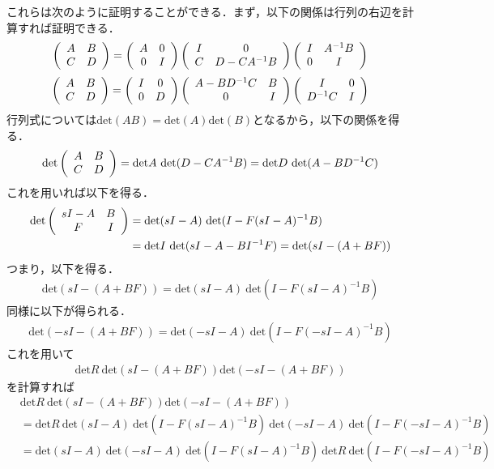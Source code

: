 これらは次のように証明することができる．まず，以下の関係は行列の右辺を計算すれば証明できる．
\begin{align}
	\bmatrix{cc}
		A & B \\
		C & D
	\ematrix
	=
	\bmatrix{cc}
		A & 0 \\
		0 & I
	\ematrix
	\bmatrix{cc}
		I & 0 \\
		C & D-C A^{-1}B
	\ematrix
	\bmatrix{cc}
		I & A^{-1}B \\
		0 & I
	\ematrix
\nonumber
\end{align}
\begin{align}
	\bmatrix{cc}
		A & B \\
		C & D
	\ematrix
	=
	\bmatrix{cc}
		I & 0 \\
		0 & D
	\ematrix
	\bmatrix{cc}
		A - B D^{-1} C & B \\
		0              & I
	\ematrix
	\bmatrix{cc}
		I        & 0 \\
		D^{-1} C & I
	\ematrix
\nonumber
\end{align}
行列式については$\mbox{det}(AB) = \mbox{det}(A)\mbox{det}(B)$となるから，以下の関係を得る．
\begin{align}
	\mbox{det}
	\bmatrix{cc}
		A & B \\
		C & D
	\ematrix
	=
	\mbox{det}A \ \mbox{det}(D-CA^{-1}B)
	=
	\mbox{det}D \ \mbox{det}({A-BD^{-1}C})	
\nonumber
\end{align}
これを用いれば以下を得る．
\begin{align}
	\mbox{det}
	\bmatrix{cc}
		sI-A & B \\
		F    & I
	\ematrix
	&=
	\mbox{det}(sI-A) \ \mbox{det}(I- F(sI-A)^{-1}B)
\nonumber \\
	&=
	\mbox{det}I \ \mbox{det}({sI-A - B I^{-1}F})	
	=
	\mbox{det}({sI-(A + B F)})	
\nonumber
\end{align}
つまり，以下を得る．
\begin{align}
	\mbox{det}({sI-(A + B F)})	
	=
	\mbox{det}(sI-A) \ \mbox{det}(I- F(sI-A)^{-1}B)
\end{align}
同様に以下が得られる．
\begin{align}
	\mbox{det}({-sI-(A + B F)})	
	=
	\mbox{det}(-sI-A) \ \mbox{det}(I- F(-sI-A)^{-1}B)
\end{align}
これを用いて
\begin{align}
	\mbox{det}R \ \mbox{det}({sI-(A + B F)})\mbox{det}({-sI-(A + B F)})
\nonumber
\end{align}
を計算すれば
\begin{align}
	& %
	\mbox{det}R \ \mbox{det}({sI-(A + B F)})\mbox{det}({-sI-(A + B F)})
\nonumber \\
		&= \mbox{det}R \ \mbox{det}(sI-A) \ \mbox{det}(I- F(sI-A)^{-1}B)
			\ \mbox{det}(-sI-A) \ \mbox{det}(I- F(-sI-A)^{-1}B)
\nonumber \\
		&= \mbox{det}(sI-A) \ \mbox{det}(-sI-A) \ 
			\mbox{det}(I- F(sI-A)^{-1}B) \ \mbox{det}R \ \mbox{det}(I- F(-sI-A)^{-1}B)
\end{align}
